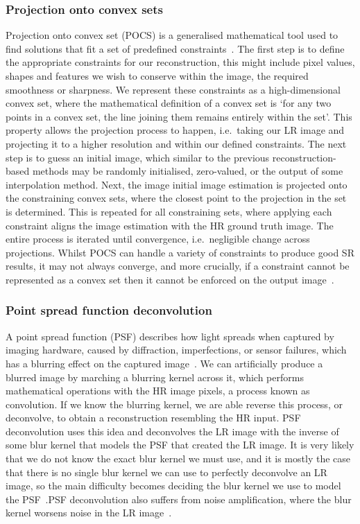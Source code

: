 \subsubsection{Projection onto convex sets}
Projection onto convex set (POCS) is a generalised mathematical tool used to find solutions that fit a set of predefined constraints~\cite{ref}. The first step is to define the appropriate constraints for our reconstruction, this might include pixel values, shapes and features we wish to conserve within the image, the required smoothness or sharpness. We represent these constraints as a high-dimensional convex set, where the mathematical definition of a convex set is `for any two points in a convex set, the line joining them remains entirely within the set'. This property allows the projection process to happen, i.e.\ taking our LR image and projecting it to a higher resolution and within our defined constraints. The next step is to guess an initial image, which similar to the previous reconstruction-based methods may be randomly initialised, zero-valued, or the output of some interpolation method. Next, the image initial image estimation is projected onto the constraining convex sets, where the closest point to the projection in the set is determined. This is repeated for all constraining sets, where applying each constraint aligns the image estimation with the HR ground truth image. The entire process is iterated until convergence, i.e.\ negligible change across projections. Whilst POCS can handle a variety of constraints to produce good SR results, it may not always converge, and more crucially, if a constraint cannot be represented as a convex set then it cannot be enforced on the output image~\cite{ref}.

\subsubsection{Point spread function deconvolution}
A point spread function (PSF) describes how light spreads when captured by imaging hardware, caused by diffraction, imperfections, or sensor failures, which has a blurring effect on the captured image~\cite{ref}. We can artificially produce a blurred image by marching a blurring kernel across it, which performs mathematical operations with the HR image pixels, a process known as convolution. If we know the blurring kernel, we are able reverse this process, or deconvolve, to obtain a reconstruction resembling the HR input. PSF deconvolution uses this idea and deconvolves the LR image with the inverse of some blur kernel that models the PSF that created the LR image. It is very likely that we do not know the exact blur kernel we must use, and it is mostly the case that there is no single blur kernel we can use to perfectly deconvolve an LR image, so the main difficulty becomes deciding the blur kernel we use to model the PSF~\cite{ref}.\@ PSF deconvolution also suffers from noise amplification, where the blur kernel worsens noise in the LR image~\cite{ref}.

